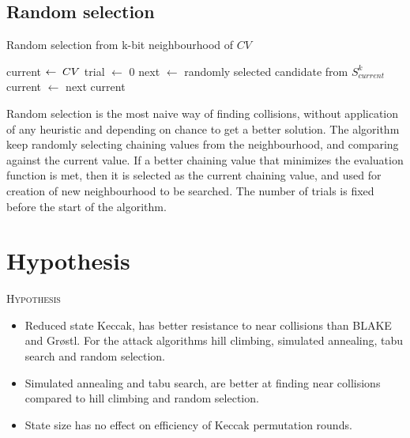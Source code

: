 \subsection{Random selection}

\begin{algorithm}[H]
  \caption{ Random selection from k-bit neighbourhood of $CV$ }
  \begin{algorithmic}[1]
      \State current $\gets \thickspace CV$
      \State trial $\gets$ 0
        \State next $\gets$ randomly selected candidate from $S^{k}_{current}$
          \State current $\gets$ next
        \EndIf
      \EndWhile 
      \State \Return current
    \EndFunction
  \end{algorithmic}
\end{algorithm}

Random selection is the most naive way of finding collisions, without application of any heuristic and depending on
chance to get a better solution. The algorithm keep randomly selecting chaining values from the neighbourhood, and
comparing against the current value. If a better chaining value that minimizes the evaluation function is met, then
it is selected as the current chaining value, and used for creation of new neighbourhood to be searched. The number
of trials is fixed before the start of the algorithm.

\newpage
\section{Hypothesis}

\begin{center}
  \framebox
  {
    \parbox{400pt}
    {
      \centering \textsc{Hypothesis} \\
      \begin{itemize}
      \item Reduced state Keccak, has better resistance to near collisions than BLAKE and Gr{\o}stl. For the
      attack algorithms hill climbing, simulated annealing, tabu search and random selection.
      \item Simulated annealing and tabu search, are better at finding near collisions compared to hill 
      climbing and random selection.
      \item State size has no effect on efficiency of Keccak permutation rounds.
      \end{itemize}
    }
  }
\end{center}

